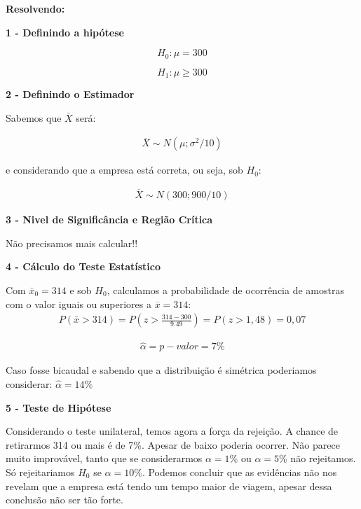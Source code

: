 \documentclass[
  letterpaper,
  DIV=11,
  numbers=noendperiod]{scrartcl}
\begin{document}
\textbf{Resolvendo:}

\vspace{0.5cm}

\textbf{1 - Definindo a hipótese}

\[H_0: \mu=300\]

\[H_1: \mu\geq 300\]

\vspace{0.5cm}

\textbf{2 - Definindo o Estimador}

Sabemos que \(\bar{X}\) será:

\[\begin{array}{ccc}
\overline{X} \sim N (\mu; \sigma^{2}/10 )
\end{array}\]

e considerando que a empresa está correta, ou seja, sob \(H_0\):

\[\begin{array}{ccc}
\overline{X} \sim N (300; 900/10)
\end{array}\]

\vspace{0.5cm}

\textbf{3 - Nivel de Significância e Região Crítica}

Não precisamos mais calcular!!

\vspace{0.5cm}

\textbf{4 - Cálculo do Teste Estatístico}

Com \(\bar{x}_0=314\) e sob \(H_0\), calculamos a probabilidade de
ocorrência de amostras com o valor iguais ou superiores a
\(\overline{x}=314\): \[\begin{array}{ccc}
P(\bar{x}>314)=P(z>\frac{314-300}{9.49})=P(z>1,48)=0,07
\end{array}\]

\[\begin{array}{ccc}
\hat{\alpha}=p-valor=7\%
\end{array}\]

Caso fosse bicaudal e sabendo que a distribuição é simétrica poderiamos
considerar: \(\hat{\alpha}=14\%\)

\vspace{0.5cm}

\textbf{5 - Teste de Hipótese}

Considerando o teste unilateral, temos agora a força da rejeição. A
chance de retirarmos 314 ou mais é de 7\%. Apesar de baixo poderia
ocorrer. Não parece muito improvável, tanto que se considerarmos
\(\alpha=1\%\) ou \(\alpha=5\%\) não rejeitamos. Só rejeitariamos
\(H_0\) se \(\alpha=10\%\). Podemos concluir que as evidências não nos
revelam que a empresa está tendo um tempo maior de viagem, apesar dessa
conclusão não ser tão forte.\\
\end{document}
